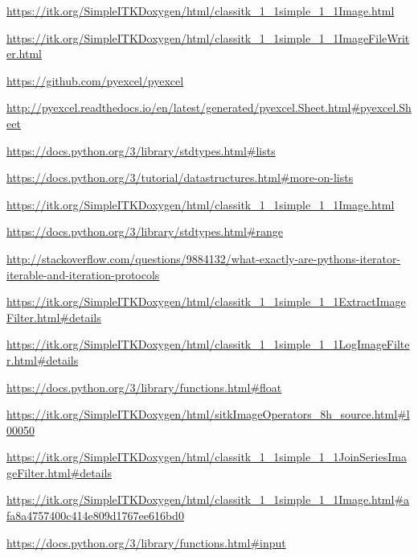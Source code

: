 \documentclass[a4paper,12pt, doubleside]{report}
\begin{document}
\begin{thebibliography}{1}
        \url{https://itk.org/SimpleITKDoxygen/html/classitk_1_1simple_1_1Image.html}
        
        \url{https://itk.org/SimpleITKDoxygen/html/classitk_1_1simple_1_1ImageFileWriter.html}
        
        \url{https://github.com/pyexcel/pyexcel}
        
        \url{http://pyexcel.readthedocs.io/en/latest/generated/pyexcel.Sheet.html#pyexcel.Sheet}
        
        \url{https://docs.python.org/3/library/stdtypes.html#lists} 
       
        \url{https://docs.python.org/3/tutorial/datastructures.html#more-on-lists}
        
        \url{https://itk.org/SimpleITKDoxygen/html/classitk_1_1simple_1_1Image.html}
    
        \url{https://docs.python.org/3/library/stdtypes.html#range}
        
        \url{http://stackoverflow.com/questions/9884132/what-exactly-are-pythons-iterator-iterable-and-iteration-protocols} 
        
        \url{https://itk.org/SimpleITKDoxygen/html/classitk_1_1simple_1_1ExtractImageFilter.html#details}
        
        \url{https://itk.org/SimpleITKDoxygen/html/classitk_1_1simple_1_1LogImageFilter.html#details}
        
        \url{https://docs.python.org/3/library/functions.html#float}
    
        \url{https://itk.org/SimpleITKDoxygen/html/sitkImageOperators_8h_source.html#l00050}
    
        \url{https://itk.org/SimpleITKDoxygen/html/classitk_1_1simple_1_1JoinSeriesImageFilter.html#details}
    
        \url{https://itk.org/SimpleITKDoxygen/html/classitk_1_1simple_1_1Image.html#afa8a4757400c414e809d1767ee616bd0}

        \url{https://docs.python.org/3/library/functions.html#input}
        

\end{thebibliography}
\end{document}
